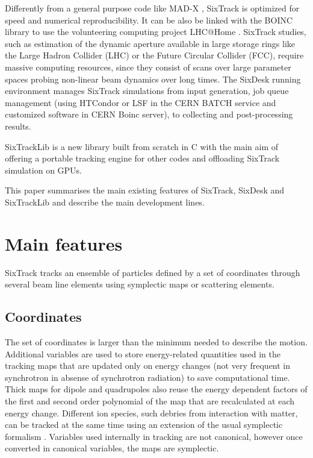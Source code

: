 \documentclass[a4paper,
              ]{jacow}
\begin{document}
Differently from a general purpose code like MAD-X \cite{madx}, SixTrack is optimized for speed and numerical reproducibility. It can be also be linked with the BOINC library to use the volunteering computing project LHC@Home \cite{lhcathome}.
SixTrack studies, such as  estimation of the dynamic aperture available in large storage rings like the Large Hadron Collider (LHC) or the Future Circular Collider (FCC), require massive computing resources, since they consist of scans over large parameter spaces probing non-linear beam dynamics over long times.
The SixDesk running environment manages SixTrack simulations from input generation, job queue management (using HTCondor or LSF in the CERN BATCH service and customized software in CERN Boinc server), to collecting and post-processing results.  

SixTrackLib is a new library built from scratch in C with the main aim of offering a portable tracking engine for other codes and offloading SixTrack simulation on GPUs.

This paper summarises the main existing features of SixTrack, SixDesk and SixTrackLib and describe the main development lines.

\section{Main features}

SixTrack tracks an ensemble of particles defined by a set of coordinates through several beam line elements using symplectic maps \cite{ripken95, heinemann95, barber87} or scattering elements.

\subsection{Coordinates}
The set of coordinates is larger than the minimum needed to describe the motion.
Additional variables are used to store energy-related quantities used in the tracking maps that are updated only on energy changes (not very frequent in synchrotron in absense of synchrotron radiation) to save computational time. Thick maps for dipole and quadrupoles also reuse the energy dependent factors of the first and second order polynomial of the map that are recalculated at each energy change. Different ion species, such debries from interaction with matter, can be tracked at the same time using an extension of the usual symplectic formalism \cite{ions}. Variables used internally in tracking are not canonical, however once converted in canonical variables, the maps are symplectic. 
\end{document}
